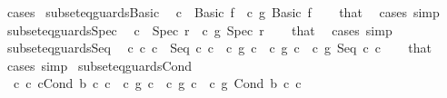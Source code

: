 \begin{isabellebody}
\ cases%
\endisatagproof
{\isafoldproof}%
%
\isadelimproof
\isanewline
%
\endisadelimproof
\isanewline
{}\isamarkupfalse%
\ subseteq{\isacharunderscore}guards{\isacharunderscore}Basic{\isacharcolon}\isanewline
\ \ {\isachardoublequoteopen}c\ {\isacharequal}\ Basic\ f{\isachardoublequoteclose}\ \ {\isachardoublequoteopen}c\ {\isasymsubseteq}\isactrlsub g\ Basic\ f{\isachardoublequoteclose}\isanewline
%
\isadelimproof
\ \ %
\endisadelimproof
%
\isatagproof
{}\isamarkupfalse%
\ that\ \isamarkupfalse%
\ cases\ simp%
\endisatagproof
{\isafoldproof}%
%
\isadelimproof
\isanewline
%
\endisadelimproof
\isanewline
{}\isamarkupfalse%
\ subseteq{\isacharunderscore}guards{\isacharunderscore}Spec{\isacharcolon}\isanewline
\ \ {\isachardoublequoteopen}c\ {\isacharequal}\ Spec\ r{\isachardoublequoteclose}\ \ {\isachardoublequoteopen}c\ {\isasymsubseteq}\isactrlsub g\ Spec\ r{\isachardoublequoteclose}\isanewline
%
\isadelimproof
\ \ %
\endisadelimproof
%
\isatagproof
{}\isamarkupfalse%
\ that\ \isamarkupfalse%
\ cases\ simp%
\endisatagproof
{\isafoldproof}%
%
\isadelimproof
\isanewline
%
\endisadelimproof
\isanewline
{}\isamarkupfalse%
\ subseteq{\isacharunderscore}guards{\isacharunderscore}Seq{\isacharcolon}\isanewline
\ \ {\isachardoublequoteopen}{\isasymexists}c{}{\isacharprime}\ c{}{\isacharprime}{\isachardot}\ c\ {\isacharequal}\ Seq\ c{}{\isacharprime}\ c{}{\isacharprime}\ {\isasymand}\ {\isacharparenleft}c{}{\isacharprime}\ {\isasymsubseteq}\isactrlsub g\ c{}{\isacharparenright}\ {\isasymand}\ {\isacharparenleft}c{}{\isacharprime}\ {\isasymsubseteq}\isactrlsub g\ c{}{\isacharparenright}{\isachardoublequoteclose}\ \ {\isachardoublequoteopen}c\ {\isasymsubseteq}\isactrlsub g\ Seq\ c{}\ c{}{\isachardoublequoteclose}\isanewline
%
\isadelimproof
\ \ %
\endisadelimproof
%
\isatagproof
{}\isamarkupfalse%
\ that\ \isamarkupfalse%
\ cases\ simp%
\endisatagproof
{\isafoldproof}%
%
\isadelimproof
\isanewline
%
\endisadelimproof
\isanewline
{}\isamarkupfalse%
\ subseteq{\isacharunderscore}guards{\isacharunderscore}Cond{\isacharcolon}\isanewline
\ \ {\isachardoublequoteopen}{\isasymexists}c{}{\isacharprime}\ c{}{\isacharprime}{\isachardot}\ c{\isacharequal}Cond\ b\ c{}{\isacharprime}\ c{}{\isacharprime}\ {\isasymand}\ {\isacharparenleft}c{}{\isacharprime}\ {\isasymsubseteq}\isactrlsub g\ c{}{\isacharparenright}\ {\isasymand}\ {\isacharparenleft}c{}{\isacharprime}\ {\isasymsubseteq}\isactrlsub g\ c{}{\isacharparenright}{\isachardoublequoteclose}\ \ {\isachardoublequoteopen}c\ {\isasymsubseteq}\isactrlsub g\ Cond\ b\ c{}\ c{}{\isachardoublequoteclose}\isanewline

\end{isabellebody}
